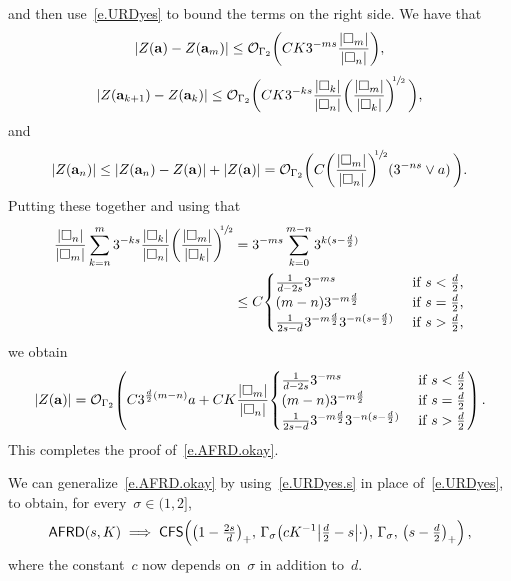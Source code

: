 \documentclass[11pt]{article} %
\let\oldsquare\square %
\renewcommand{\square}{\oldsquare}
\numberwithin{equation}{section}
\theoremstyle{definition}
\let\originalleft\left
\let\originalright\right
\renewcommand{\left}{\mathopen{}\mathclose\bgroup\originalleft}
\renewcommand{\right}{\aftergroup\egroup\originalright}
\renewcommand{\a}{\mathbf{a}}
\newcommand{\cu}{\square}
\renewcommand{\O}{\mathcal{O}}
\newcommand{\CFS}{\mathsf{CFS}}
\newcommand{\AFRD}{\mathsf{AFRD}}
\begin{document}
and then use~\eqref{e.URDyes} to bound the terms on the right side. We have that
\begin{equation*}
\left| Z(\a) - Z({\a}_m) \right| 
\leq 
\O_{\Gamma_2}
\left(CK3^{-ms} \frac{|\cu_m|}{|\cu_n|}\right),
\end{equation*}
\begin{equation*}
\left| Z({\a}_{k+1}) - Z({\a}_k) \right|
\leq 
\O_{\Gamma_2} \biggl( CK3^{-ks}\frac{|\cu_k|}{|\cu_n|}\left( \frac{|\cu_m|}{|\cu_k|} \right)^{\!\!\sfrac12} \, \biggr) ,
\end{equation*}
and
\begin{equation*}
\left| Z({\a}_n) \right| 
\leq \left| Z({\a}_n) - Z({\a}) \right|  
+ \left| Z({\a}) \right| 
=
\O_{\Gamma_2} \biggl( C\biggl( \frac{|\cu_m|}{|\cu_n|} \biggr)^{\!\!\sfrac12}   ( 3^{-ns} \vee a)     \, \biggr) .
\end{equation*}
Putting these together and using that
\begin{align*}  
\frac{|\cu_n|}{|\cu_m|}  \sum_{k=n}^m 3^{-ks}\frac{|\cu_k|}{|\cu_n|}\left( \frac{|\cu_m|}{|\cu_k|} \right)^{\!\!\sfrac12}
& =
3^{-m s} 
\sum_{k=0}^{m-n}  3^{ k(s - \frac d2) } 
\\ &
\leq
C
\begin{cases}
\frac{1}{d-2s} 3^{-m s}   &   \mbox{ if } s < \frac{d}{2},
\\
(m-n) 3^{-m \frac d2 }   & \mbox{ if } s = \frac{d}{2} ,
\\
\frac{1}{2s-d} 3^{-m \frac d2 } 3^{-n (s - \frac d2)} & \mbox{ if } s > \frac{d}{2} ,
\end{cases}
\end{align*}
 we obtain  
\begin{equation*}
\left| Z(\a) \right| = \O_{\Gamma_2} \left( 
C 3^{\frac d2 (m-n)} a 
+ 
C K \frac{|\cu_m|}{|\cu_n|}  \begin{cases}
\frac{1}{d-2s} 3^{-m s}   &   \mbox{ if } s < \frac{d}{2}
\\
(m - n) 3^{-m \frac d2 }   & \mbox{ if } s = \frac{d}{2} 
\\
\frac{1}{2s-d} 3^{-m \frac d2 }   3^{-n (s - \frac d2)}  & \mbox{ if } s > \frac{d}{2} 
\end{cases} \right) 
\,.
\end{equation*}
This completes the proof of~\eqref{e.AFRD.okay}. 

\smallskip

We can generalize~\eqref{e.AFRD.okay} by using~\eqref{e.URDyes.s} in place of~\eqref{e.URDyes}, to obtain, for every~$\sigma \in (1,2]$, 
\begin{equation}
\label{e.AFRD.okay.sigma}
\AFRD\left(s,K \right) \implies
\CFS \Bigl(  
\bigl( 1 - \tfrac {2s}{d} \bigr)_+ , \,
\Gamma_\sigma \bigl( cK^{-1} \bigl| \tfrac d2-s\bigr| \cdot \bigr), \,
\Gamma_\sigma, \,
\bigl( s - \tfrac d2 \bigr)_+
\Bigr)\,,
\end{equation}
where the constant~$c$ now depends on~$\sigma$ in addition to~$d$.
\end{document}
